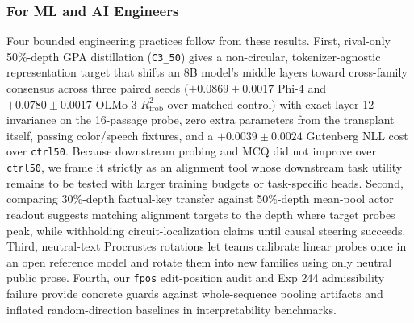 \documentclass[conference]{IEEEtran}
\begin{document}
\subsubsection{For ML and AI Engineers}
Four bounded engineering practices follow from these results. First, rival-only 50\%-depth GPA distillation (\texttt{C3\_50}) gives a non-circular, tokenizer-agnostic representation target that shifts an 8B model's middle layers toward cross-family consensus across three paired seeds ($+0.0869\pm0.0017$ Phi-4 and $+0.0780\pm0.0017$ OLMo 3 $R^2_{\text{frob}}$ over matched control) with exact layer-12 invariance on the 16-passage probe, zero extra parameters from the transplant itself, passing color/speech fixtures, and a $+0.0039\pm0.0024$ Gutenberg NLL cost over \texttt{ctrl50}. Because downstream probing and MCQ did not improve over \texttt{ctrl50}, we frame it strictly as an alignment tool whose downstream task utility remains to be tested with larger training budgets or task-specific heads. Second, comparing 30\%-depth factual-key transfer \cite{cheng2026platoskey} against 50\%-depth mean-pool actor readout suggests matching alignment targets to the depth where target probes peak, while withholding circuit-localization claims until causal steering succeeds. Third, neutral-text Procrustes rotations let teams calibrate linear probes once in an open reference model and rotate them into new families using only neutral public prose. Fourth, our \texttt{fpos} edit-position audit and Exp 244 admissibility failure provide concrete guards against whole-sequence pooling artifacts and inflated random-direction baselines in interpretability benchmarks.
\end{document}
